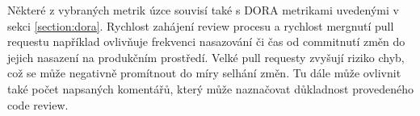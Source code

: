 Některé z vybraných metrik úzce souvisí také s DORA metrikami uvedenými v sekci \ref{section:dora}. Rychlost zahájení review procesu a rychlost mergnutí pull requestu například ovlivňuje frekvenci nasazování či čas od commitnutí změn do jejich nasazení na produkčním prostředí. Velké pull requesty zvyšují riziko chyb, což se může negativně promítnout do míry selhání změn. Tu dále může ovlivnit také počet napsaných komentářů, který může naznačovat důkladnost provedeného code review.
